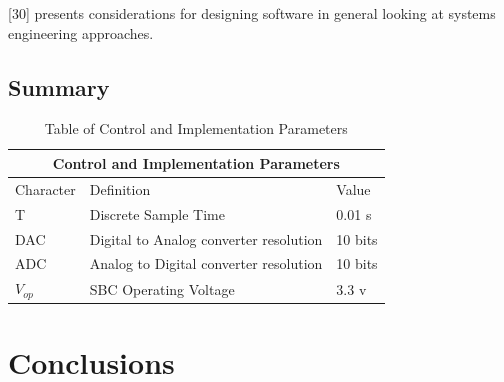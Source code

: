 \documentclass[12pt,a4paper,twoside]{report}
\begin{document}
			[30] presents considerations for designing software in general looking at systems engineering approaches.
		
		\section{Summary}	
		
		
	\newpage
	
	\begin{table}[h!]
		\centering
		\begin{tabular}{ |p{1.5cm}||p{9.5cm}|p{5cm}|  }
			\hline
			\multicolumn{3}{|c|}{Control and Implementation Parameters} \\
			\hline
			Character& Definition  & Value  \\
			\hline
			T        &  Discrete Sample Time                        & 0.01 s\\
			DAC      &  Digital to Analog converter resolution      & 10 bits\\
			ADC      &  Analog to Digital converter resolution      & 10 bits\\
			$V_{op}$ & 	SBC Operating Voltage                       & 3.3 v\\
			\hline
		\end{tabular}
		\caption{Table of Control and Implementation Parameters}
		\label{table:controlparameters}
	\end{table}

	\newpage
	
	\chapter{Conclusions}
	
	\newpage
						
				
	
				
\end{document}
